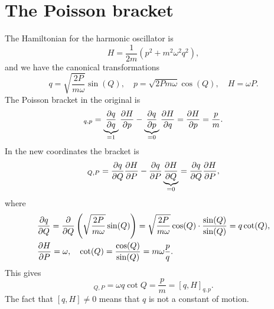 \documentclass{article}
\begin{document}
    \section{The Poisson bracket}
    The Hamiltonian for the harmonic oscillator is
    \begin{equation*}
        H = \frac{1}{2m} \left(p^2 + m^2 \omega^2 q^2\right),
    \end{equation*}
    and we have the canonical transformations
    \begin{equation*}
        q = \sqrt{\frac{2P}{m \omega}} \sin(Q), \quad p = \sqrt{2 P m \omega} \cos(Q), \quad H = \omega P.
    \end{equation*}
    The Poisson bracket in the original is
    \begin{equation*}
        [q, H]_{q, p} = \underbrace{\pdv{q}{q}}_{=1}\pdv{H}{p} - \underbrace{\pdv{q}{p}}_{=0}\pdv{H}{q} = \pdv{H}{p} = \frac{p}{m}.
    \end{equation*} 
    In the new coordinates the bracket is
    \begin{equation*}
        [q, H]_{Q, P} = \pdv{q}{Q}\pdv{H}{P} - \pdv{q}{P} \underbrace{\pdv{H}{Q}}_{= 0} = \pdv{q}{Q}\pdv{H}{P},
    \end{equation*}
    where
    \begin{align*}
        & \pdv{q}{Q} = \pdv{Q}\left(\sqrt{\frac{2P}{m \omega}} \sin(Q)\right) = \sqrt{\frac{2P}{m \omega}} \cos(Q) \cdot \frac{\sin(Q)}{\sin(Q)} = q \cot(Q), \\
        & \pdv{H}{P} = \omega, \quad \cot(Q) = \frac{\cos(Q)}{\sin(Q)} = m \omega \frac{p}{q}.
    \end{align*}
    This gives 
    \begin{equation*}
        [q, H]_{Q, P} = \omega q \cot{Q} = \frac{p}{m} = [q, H]_{q, p}.
    \end{equation*}
    The fact that $[q, H] \neq 0$ means that $q$ is not a constant of motion.
\end{document}
